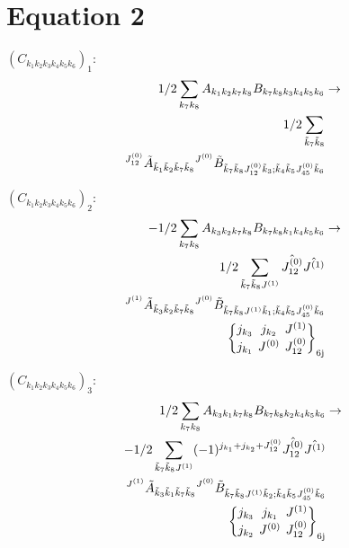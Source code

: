 \documentclass[11pt]{article}
\newcommand{\sixj}[6]{\begingroup\setlength{\arraycolsep}{0.2em}\begin{Bmatrix} #1 & #2 & #3 \\ #4 & #5 & #6 \end{Bmatrix}_{\text{6j}}\endgroup}
\begin{document}
\section{Equation 2}
$\left({C}_{{k}_{1}{k}_{2}{k}_{3}{k}_{4}{k}_{5}{k}_{6}}\right)_{1}$:
\begin{align}
1/2\sum_{{k}_{7}{k}_{8}}{A}_{{k}_{1}{k}_{2}{k}_{7}{k}_{8}}{B}_{{k}_{7}{k}_{8}{k}_{3}{k}_{4}{k}_{5}{k}_{6}}&\rightarrow \notag \\1/2\sum_{\tilde{k}_{7}\tilde{k}_{8}}& \notag \\{}^{J^{(0)}_{12}}\tilde{A}_{\tilde{k}_{1}\tilde{k}_{2}\tilde{k}_{7}\tilde{k}_{8}}{}^{J^{(0)}}\tilde{B}_{\tilde{k}_{7}\tilde{k}_{8}J^{(0)}_{12}\tilde{k}_{3};\tilde{k}_{4}\tilde{k}_{5}J^{(0)}_{45}\tilde{k}_{6}}& \notag \\
\end{align}

$\left({C}_{{k}_{1}{k}_{2}{k}_{3}{k}_{4}{k}_{5}{k}_{6}}\right)_{2}$:
\begin{align}
-1/2\sum_{{k}_{7}{k}_{8}}{A}_{{k}_{3}{k}_{2}{k}_{7}{k}_{8}}{B}_{{k}_{7}{k}_{8}{k}_{1}{k}_{4}{k}_{5}{k}_{6}}&\rightarrow \notag \\1/2\sum_{\tilde{k}_{7}\tilde{k}_{8}J^{(1)}}\hat{J^{(0)}_{12}}\hat{J^{(1)}}& \notag \\{}^{J^{(1)}}\tilde{A}_{\tilde{k}_{3}\tilde{k}_{2}\tilde{k}_{7}\tilde{k}_{8}}{}^{J^{(0)}}\tilde{B}_{\tilde{k}_{7}\tilde{k}_{8}J^{(1)}\tilde{k}_{1};\tilde{k}_{4}\tilde{k}_{5}J^{(0)}_{45}\tilde{k}_{6}}& \notag \\\sixj{j_{{k}_{3}}}{j_{{k}_{2}}}{J^{(1)}}{j_{{k}_{1}}}{J^{(0)}}{J^{(0)}_{12}}
\end{align}

$\left({C}_{{k}_{1}{k}_{2}{k}_{3}{k}_{4}{k}_{5}{k}_{6}}\right)_{3}$:
\begin{align}
1/2\sum_{{k}_{7}{k}_{8}}{A}_{{k}_{3}{k}_{1}{k}_{7}{k}_{8}}{B}_{{k}_{7}{k}_{8}{k}_{2}{k}_{4}{k}_{5}{k}_{6}}&\rightarrow \notag \\-1/2\sum_{\tilde{k}_{7}\tilde{k}_{8}J^{(1)}}(-1)^{j_{{k}_{1}} +j_{{k}_{2}} +J^{(0)}_{12} }\hat{J^{(0)}_{12}}\hat{J^{(1)}}& \notag \\{}^{J^{(1)}}\tilde{A}_{\tilde{k}_{3}\tilde{k}_{1}\tilde{k}_{7}\tilde{k}_{8}}{}^{J^{(0)}}\tilde{B}_{\tilde{k}_{7}\tilde{k}_{8}J^{(1)}\tilde{k}_{2};\tilde{k}_{4}\tilde{k}_{5}J^{(0)}_{45}\tilde{k}_{6}}& \notag \\\sixj{j_{{k}_{3}}}{j_{{k}_{1}}}{J^{(1)}}{j_{{k}_{2}}}{J^{(0)}}{J^{(0)}_{12}}
\end{align}
\end{document}
